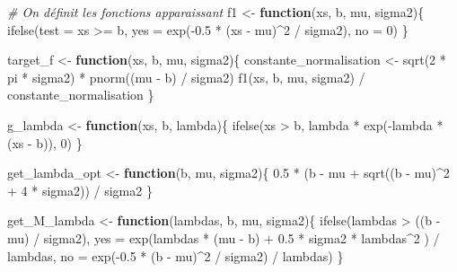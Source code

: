 \documentclass[
]{article}
\newenvironment{Shaded}{\begin{snugshade}}{\end{snugshade}}
\newcommand{\AttributeTok}[1]{\textcolor[rgb]{0.77,0.63,0.00}{#1}}
\newcommand{\CommentTok}[1]{\textcolor[rgb]{0.56,0.35,0.01}{\textit{#1}}}
\newcommand{\ControlFlowTok}[1]{\textcolor[rgb]{0.13,0.29,0.53}{\textbf{#1}}}
\newcommand{\DecValTok}[1]{\textcolor[rgb]{0.00,0.00,0.81}{#1}}
\newcommand{\FloatTok}[1]{\textcolor[rgb]{0.00,0.00,0.81}{#1}}
\newcommand{\FunctionTok}[1]{\textcolor[rgb]{0.00,0.00,0.00}{#1}}
\newcommand{\NormalTok}[1]{#1}
\newcommand{\OtherTok}[1]{\textcolor[rgb]{0.56,0.35,0.01}{#1}}
\newcommand{\SpecialCharTok}[1]{\textcolor[rgb]{0.00,0.00,0.00}{#1}}
\begin{document}
\begin{Shaded}
\begin{Highlighting}[]
\CommentTok{\# On définit les fonctions apparaissant}
\NormalTok{f1 }\OtherTok{\textless{}{-}} \ControlFlowTok{function}\NormalTok{(xs, b, mu, sigma2)\{}
  \FunctionTok{ifelse}\NormalTok{(}\AttributeTok{test =}\NormalTok{ xs }\SpecialCharTok{\textgreater{}=}\NormalTok{ b,}
         \AttributeTok{yes =} \FunctionTok{exp}\NormalTok{(}\SpecialCharTok{{-}}\FloatTok{0.5} \SpecialCharTok{*}\NormalTok{ (xs }\SpecialCharTok{{-}}\NormalTok{ mu)}\SpecialCharTok{\^{}}\DecValTok{2} \SpecialCharTok{/}\NormalTok{ sigma2),}
         \AttributeTok{no =} \DecValTok{0}\NormalTok{)}
\NormalTok{\}}

\NormalTok{target\_f }\OtherTok{\textless{}{-}} \ControlFlowTok{function}\NormalTok{(xs, b, mu, sigma2)\{}
\NormalTok{  constante\_normalisation }\OtherTok{\textless{}{-}} \FunctionTok{sqrt}\NormalTok{(}\DecValTok{2} \SpecialCharTok{*}\NormalTok{ pi }\SpecialCharTok{*}\NormalTok{ sigma2) }\SpecialCharTok{*} \FunctionTok{pnorm}\NormalTok{((mu }\SpecialCharTok{{-}}\NormalTok{ b) }\SpecialCharTok{/}\NormalTok{ sigma2)}
  \FunctionTok{f1}\NormalTok{(xs, b, mu, sigma2) }\SpecialCharTok{/}\NormalTok{ constante\_normalisation}
\NormalTok{\}}

\NormalTok{g\_lambda }\OtherTok{\textless{}{-}} \ControlFlowTok{function}\NormalTok{(xs, b, lambda)\{}
  \FunctionTok{ifelse}\NormalTok{(xs }\SpecialCharTok{\textgreater{}}\NormalTok{ b, lambda }\SpecialCharTok{*} \FunctionTok{exp}\NormalTok{(}\SpecialCharTok{{-}}\NormalTok{lambda }\SpecialCharTok{*}\NormalTok{ (xs }\SpecialCharTok{{-}}\NormalTok{ b)), }\DecValTok{0}\NormalTok{)}
\NormalTok{\}}

\NormalTok{get\_lambda\_opt }\OtherTok{\textless{}{-}} \ControlFlowTok{function}\NormalTok{(b, mu, sigma2)\{}
  \FloatTok{0.5} \SpecialCharTok{*}\NormalTok{ (b }\SpecialCharTok{{-}}\NormalTok{ mu }\SpecialCharTok{+} \FunctionTok{sqrt}\NormalTok{((b }\SpecialCharTok{{-}}\NormalTok{ mu)}\SpecialCharTok{\^{}}\DecValTok{2} \SpecialCharTok{+} \DecValTok{4} \SpecialCharTok{*}\NormalTok{ sigma2)) }\SpecialCharTok{/}\NormalTok{ sigma2}
\NormalTok{\}}

\NormalTok{get\_M\_lambda }\OtherTok{\textless{}{-}} \ControlFlowTok{function}\NormalTok{(lambdas, b, mu, sigma2)\{}
  \FunctionTok{ifelse}\NormalTok{(lambdas }\SpecialCharTok{\textgreater{}}\NormalTok{ ((b }\SpecialCharTok{{-}}\NormalTok{ mu) }\SpecialCharTok{/}\NormalTok{ sigma2),}
         \AttributeTok{yes =} \FunctionTok{exp}\NormalTok{(lambdas }\SpecialCharTok{*}\NormalTok{ (mu }\SpecialCharTok{{-}}\NormalTok{ b) }\SpecialCharTok{+} \FloatTok{0.5} \SpecialCharTok{*}\NormalTok{ sigma2 }\SpecialCharTok{*}\NormalTok{ lambdas}\SpecialCharTok{\^{}}\DecValTok{2}\NormalTok{ ) }\SpecialCharTok{/}\NormalTok{ lambdas,}
         \AttributeTok{no =} \FunctionTok{exp}\NormalTok{(}\SpecialCharTok{{-}}\FloatTok{0.5} \SpecialCharTok{*}\NormalTok{ (b }\SpecialCharTok{{-}}\NormalTok{ mu)}\SpecialCharTok{\^{}}\DecValTok{2} \SpecialCharTok{/}\NormalTok{ sigma2) }\SpecialCharTok{/}\NormalTok{ lambdas)}
\NormalTok{\}}
\end{Highlighting}
\end{Shaded}
\end{document}
